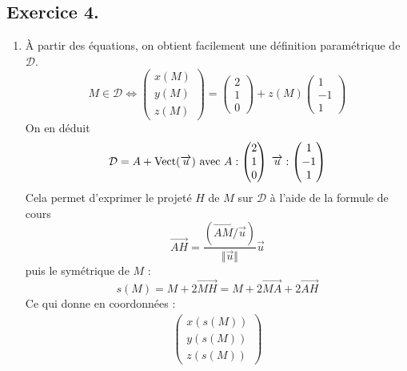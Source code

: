 \subsection*{Exercice 4.}
\begin{enumerate}
 \item \`A partir des équations, on obtient facilement une définition paramétrique de $\mathcal{D}$.
\begin{displaymath}
 M\in \mathcal{D}\Leftrightarrow
\begin{pmatrix}
 x(M)\\y(M)\\z(M)
\end{pmatrix}
=
\begin{pmatrix}
 2\\1\\0
\end{pmatrix}
+z(M)
\begin{pmatrix}
 1\\-1\\1
\end{pmatrix}
\end{displaymath}
On en déduit
\begin{displaymath}
 \mathcal D = A +\operatorname{Vect}(\overrightarrow u) \text{ avec }
A :
\begin{pmatrix}
 2\\1\\0
\end{pmatrix}
\;
\overrightarrow u : 
\begin{pmatrix}
 1\\-1\\1
\end{pmatrix}
\end{displaymath}
Cela permet d'exprimer le projeté $H$ de $M$ sur $\mathcal{D}$ à l'aide de la formule de cours
\begin{displaymath}
 \overrightarrow{AH}=
\frac{(\overrightarrow{AM}/\overrightarrow u)}{\Vert \overrightarrow u \Vert}\overrightarrow u
\end{displaymath}
puis le symétrique de $M$ :
\begin{displaymath}
 s(M) = M + 2\overrightarrow{MH}
= M + 2\overrightarrow{MA} + 2\overrightarrow{AH}
\end{displaymath}
Ce qui donne en coordonnées :
\begin{multline*}
\begin{pmatrix}
 x(s(M))\\y(s(M))\\z(s(M))
\end{pmatrix}

\end{multline*}
\end{enumerate}
